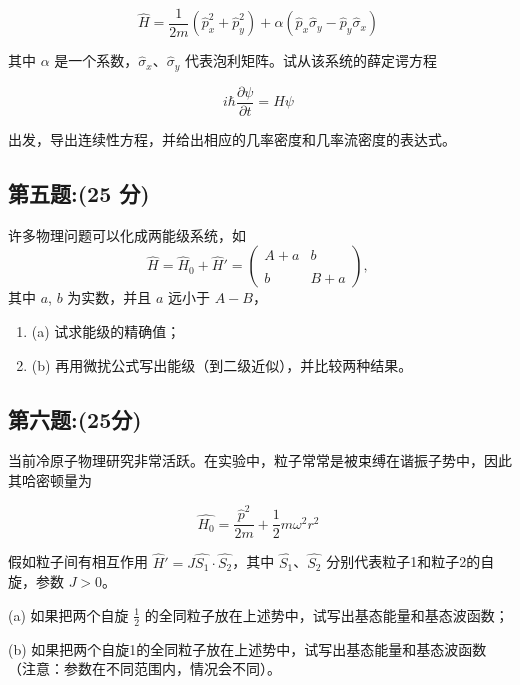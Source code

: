 \begin{equation}
    \hat{H} = \frac{1}{2m} \left( \hat{p}_x^2 + \hat{p}_y^2 \right) + \alpha \left( \hat{p}_x \hat{\sigma}_y - \hat{p}_y \hat{\sigma}_x \right)~
\end{equation}

其中 $\alpha$ 是一个系数，$\hat{\sigma}_x$、$\hat{\sigma}_y$ 代表泡利矩阵。试从该系统的薛定谔方程

\begin{equation}
    i \hbar \frac{\partial \psi}{\partial t} = H \psi~
\end{equation}

出发，导出连续性方程，并给出相应的几率密度和几率流密度的表达式。
\subsection{第五题:(25 分)}
许多物理问题可以化成两能级系统，如
\[\hat{H} = \hat{H}_0 + \hat{H}' = \begin{pmatrix} A + a & b \\\\ b & B +a \end{pmatrix},~\]
其中 \(a\), \(b\) 为实数，并且 \(a\) 远小于 \(A - B\)，

\begin{enumerate}
    \item (a) 试求能级的精确值；
    \item (b) 再用微扰公式写出能级（到二级近似），并比较两种结果。
\end{enumerate}
\subsection{第六题:(25分)}

当前冷原子物理研究非常活跃。在实验中，粒子常常是被束缚在谐振子势中，因此其哈密顿量为

\[\hat{H_0} = \frac{\hat{p}^2}{2m} + \frac{1}{2}m\omega^2r^2~\]

假如粒子间有相互作用 \(\hat{H}' = J\hat{S_1} \cdot \hat{S_2}\)，其中 \(\hat{S_1}\)、\(\hat{S_2}\) 分别代表粒子1和粒子2的自旋，参数 \(J > 0\)。

(a) 如果把两个自旋 \(\frac{1}{2}\) 的全同粒子放在上述势中，试写出基态能量和基态波函数；

(b) 如果把两个自旋1的全同粒子放在上述势中，试写出基态能量和基态波函数（注意：参数在不同范围内，情况会不同）。

